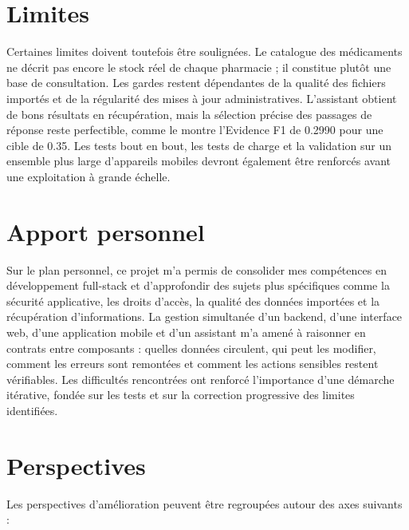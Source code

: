 \section*{Limites}

Certaines limites doivent toutefois être soulignées. Le catalogue des médicaments ne décrit pas encore le
stock réel de chaque pharmacie ; il constitue plutôt une base de consultation. Les gardes restent
dépendantes de la qualité des fichiers importés et de la régularité des mises à jour administratives.
L'assistant obtient de bons résultats en récupération, mais la sélection précise des passages de réponse
reste perfectible, comme le montre l'Evidence F1 de 0.2990 pour une cible de 0.35. Les tests bout en bout,
les tests de charge et la validation sur un ensemble plus large d'appareils mobiles devront également être
renforcés avant une exploitation à grande échelle.

\section*{Apport personnel}

Sur le plan personnel, ce projet m'a permis de consolider mes compétences en développement full-stack et
d'approfondir des sujets plus spécifiques comme la sécurité applicative, les droits d'accès, la qualité des
données importées et la récupération d'informations. La gestion simultanée d'un backend, d'une interface
web, d'une application mobile et d'un assistant m'a amené à raisonner en contrats entre composants :
quelles données circulent, qui peut les modifier, comment les erreurs sont remontées et comment les actions
sensibles restent vérifiables. Les difficultés rencontrées ont renforcé l'importance d'une démarche
itérative, fondée sur les tests et sur la correction progressive des limites identifiées.

\section*{Perspectives}

Les perspectives d'amélioration peuvent être regroupées autour des axes suivants :

